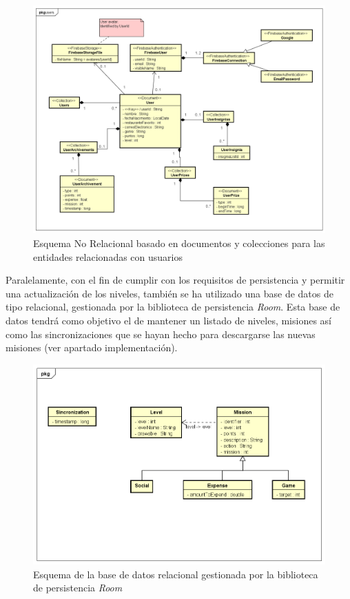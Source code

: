 \documentclass[twoside]{report}
\begin{document}
\begin{figure}[H]
\centering
\includegraphics[scale=0.5]{images/databaseNRusers}
\caption{Esquema No Relacional basado en documentos y colecciones para las entidades relacionadas con usuarios}
\end{figure}

Paralelamente, con el fin de cumplir con los requisitos de persistencia y permitir una actualización de los niveles, también se ha utilizado una base de datos de tipo relacional, gestionada por la biblioteca de persistencia \cite{roompersistence} \textit{Room}. Esta base de datos tendrá como objetivo el de mantener un listado de niveles, misiones así como las sincronizaciones que se hayan hecho para descargarse las nuevas misiones (ver apartado implementación).

\begin{figure}[H]
\centering
\includegraphics[scale=0.5]{images/databaseRoom}
\caption{Esquema de la base de datos relacional gestionada por la biblioteca de persistencia \cite{roompersistence} \textit{Room}}
\end{figure}
\end{document}
